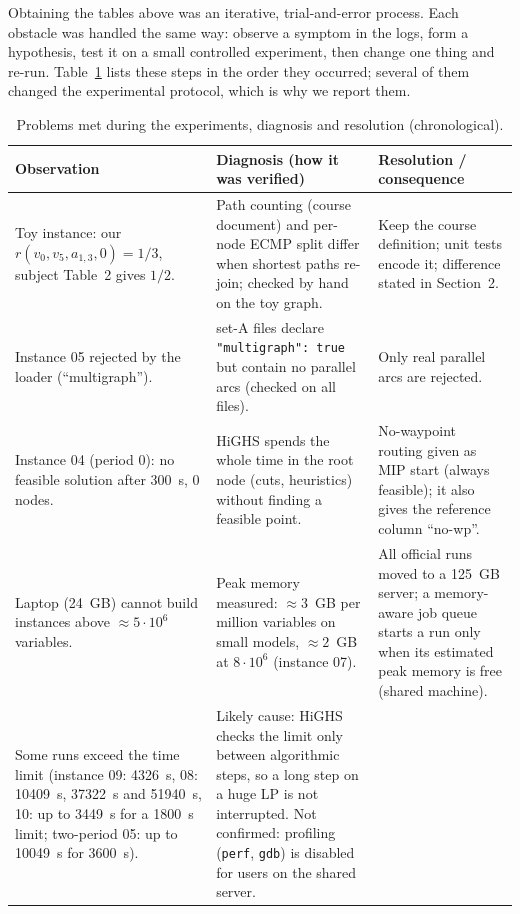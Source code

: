 \documentclass[11pt,a4paper]{article}
\begin{document}
Obtaining the tables above was an iterative, trial-and-error process. Each obstacle was handled the same way:
observe a symptom in the logs, form a hypothesis, test it on a small controlled experiment, then change one thing and
re-run. Table~\ref{tab:process} lists these steps in the order they occurred; several of them changed the
experimental protocol, which is why we report them.

\begin{table}[H]\centering\footnotesize\renewcommand{\arraystretch}{1.15}
\caption{Problems met during the experiments, diagnosis and resolution (chronological).}\label{tab:process}
\begin{tabularx}{\textwidth}{@{}>{\raggedright\arraybackslash}p{3.6cm}>{\raggedright\arraybackslash}X>{\raggedright\arraybackslash}X@{}}
\toprule
Observation & Diagnosis (how it was verified) & Resolution / consequence \\
\midrule
Toy instance: our $r(v_0,v_5,a_{1,3},0)=1/3$, subject Table~2 gives $1/2$.
& Path counting (course document) and per-node ECMP split differ when shortest paths re-join; checked by hand on the toy graph.
& Keep the course definition; unit tests encode it; difference stated in Section~2. \\
Instance 05 rejected by the loader (``multigraph'').
& 10 set-A files declare \texttt{"multigraph": true} but contain no parallel arcs (checked on all files).
& Only real parallel arcs are rejected. \\
Instance 04 (period 0): no feasible solution after 300~s, 0 nodes.
& HiGHS spends the whole time in the root node (cuts, heuristics) without finding a feasible point.
& No-waypoint routing given as MIP start (always feasible); it also gives the reference column ``no-wp''. \\
Laptop (24~GB) cannot build instances above $\approx5\cdot10^6$ variables.
& Peak memory measured: $\approx3$~GB per million variables on small models, $\approx2$~GB at $8\cdot10^6$ (instance 07).
& All official runs moved to a 125~GB server; a memory-aware job queue starts a run only when its estimated peak
memory is free (shared machine). \\
Some runs exceed the time limit (instance 09: 4326~s, 08: 10409~s, 37322~s and 51940~s, 10: up to 3449~s for a 1800~s limit; two-period 05: up to 10049~s for 3600~s).
& Likely cause: HiGHS checks the limit only between algorithmic steps, so a long step on a huge LP is not interrupted.
Not confirmed: profiling (\texttt{perf}, \texttt{gdb}) is disabled for users on the shared server.

\end{tabularx}
\end{table}
\end{document}
